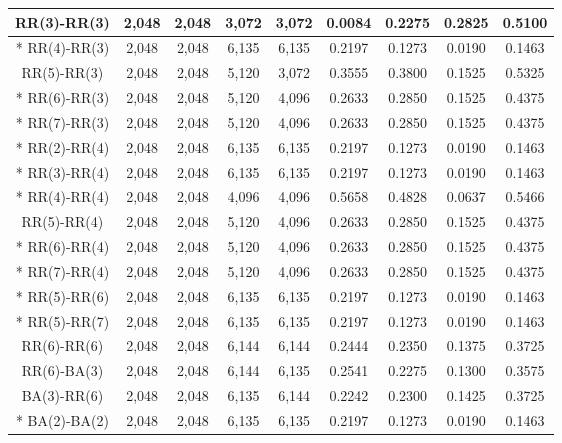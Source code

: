 \begin{table}[!htb]
\begin{center}
\begin{tabular}{c|c|c|c|c|c|c|c|c}
			RR(3)-RR(3)            & 2,048  & 2,048   & 3,072   & 3,072   &  0.0084   & 0.2275 & 0.2825 & 0.5100   \\ \hline
		*	RR(4)-RR(3)            & 2,048 	& 2,048   & 6,135   & 6,135   & 0.2197    & 0.1273 & 0.0190 & 0.1463   \\ \hline
			RR(5)-RR(3)            & 2,048 	& 2,048   & 5,120   & 3,072   &  0.3555   & 0.3800 & 0.1525 & 0.5325   \\ \hline
		*	RR(6)-RR(3)            & 2,048  & 2,048   & 5,120   & 4,096   & 0.2633    & 0.2850 & 0.1525 & 0.4375   \\ \hline
		*	RR(7)-RR(3)            & 2,048  & 2,048   & 5,120   & 4,096   & 0.2633    & 0.2850 & 0.1525 & 0.4375   \\ \hline
		*	RR(2)-RR(4)            & 2,048 	& 2,048   & 6,135   & 6,135   & 0.2197    & 0.1273 & 0.0190 & 0.1463   \\ \hline
		*	RR(3)-RR(4)            & 2,048 	& 2,048   & 6,135   & 6,135   & 0.2197    & 0.1273 & 0.0190 & 0.1463   \\ \hline
		*	RR(4)-RR(4)            & 2,048  & 2,048   & 4,096   & 4,096   & 0.5658    & 0.4828 & 0.0637 & 0.5466   \\ \hline
			RR(5)-RR(4)            & 2,048  & 2,048   & 5,120   & 4,096   &  0.2633   & 0.2850 & 0.1525 & 0.4375   \\ \hline
		*	RR(6)-RR(4)            & 2,048  & 2,048   & 5,120   & 4,096   & 0.2633    & 0.2850 & 0.1525 & 0.4375   \\ \hline
		*	RR(7)-RR(4)            & 2,048  & 2,048   & 5,120   & 4,096   & 0.2633    & 0.2850 & 0.1525 & 0.4375   \\ \hline
		*	RR(5)-RR(6)            & 2,048 	& 2,048   & 6,135   & 6,135   & 0.2197    & 0.1273 & 0.0190 & 0.1463   \\ \hline
		*	RR(5)-RR(7)            & 2,048 	& 2,048   & 6,135   & 6,135   & 0.2197    & 0.1273 & 0.0190 & 0.1463   \\ \hline
			RR(6)-RR(6)            & 2,048  & 2,048   & 6,144   & 6,144   &  0.2444   & 0.2350 & 0.1375 & 0.3725   \\ \hline
			RR(6)-BA(3)            & 2,048 	& 2,048   & 6,144   & 6,135   &  0.2541   & 0.2275 & 0.1300 & 0.3575   \\ \hline 
			BA(3)-RR(6)            & 2,048 	& 2,048   & 6,135   & 6,144   &  0.2242   & 0.2300 & 0.1425 & 0.3725   \\ \hline
		*	BA(2)-BA(2)            & 2,048 	& 2,048   & 6,135   & 6,135   & 0.2197    & 0.1273 & 0.0190 & 0.1463   \\ \hline

\end{tabular}
\end{center}
\end{table}
